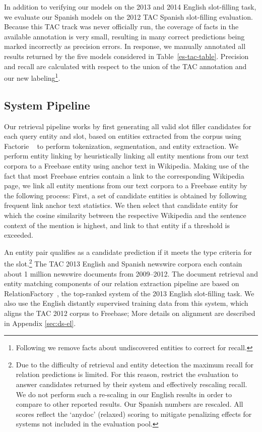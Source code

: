 In addition to verifying our models on the 2013 and 2014 English slot-filling task, we evaluate our Spanish models on the 2012 TAC Spanish slot-filling evaluation. Because this TAC track was never officially run, the coverage of facts in the available annotation is very small, resulting in many correct predictions being marked incorrectly as precision errors. In response, we manually annotated all results returned by the five models considered in Table~\ref{es-tac-table}. Precision and recall are calculated with respect to the union of the TAC annotation and our new labeling\footnote{Following \citet{surdeanu2012multi} we remove facts about undiscovered entities to correct for recall.}.



\subsection { System Pipeline \label{sec:pipeline}}
Our retrieval pipeline works by first generating all valid slot filler candidates for each query entity and slot, based on entities extracted from the corpus using {\sc Factorie} ~\citep{mccallum09:factorie:} to perform tokenization, segmentation, and entity extraction. We perform entity linking by heuristically linking all entity mentions from our text corpora to a Freebase entity using anchor text in Wikipedia. Making use of the fact that most Freebase entries contain a link to the corresponding Wikipedia page, we link all entity mentions from our text corpora to a Freebase entity by the following process:
First, a set of candidate entities is obtained by following frequent link anchor text statistics.
We then select that candidate entity for which the cosine similarity between the respective Wikipedia and the sentence context of the mention is highest, and link to that entity if a threshold is exceeded.

An entity pair qualifies as a candidate prediction if it meets the type criteria for the slot.\footnote{Due to the difficulty of retrieval and entity detection the maximum recall for relation predictions is limited. For this reason, \citet{surdeanu2012multi} restrict the evaluation to answer candidates returned by their system and effectively rescaling recall. We do not perform such a re-scaling in our English results in order to compare to other reported results. Our Spanish numbers are rescaled. All scores reflect the `anydoc' (relaxed) scoring to mitigate penalizing effects for systems not included in the evaluation pool.} The TAC 2013 English and Spanish newswire corpora each contain about 1 million newswire documents from 2009--2012. The document retrieval and entity matching components of our relation extraction pipeline are based on RelationFactory~\citep{roth2014relationfactory}, the top-ranked system of the 2013 English slot-filling task. We also use the English distantly supervised training data from this system, which aligns the TAC 2012 corpus to Freebase; More details on alignment are described in Appendix \ref{sec:ds-el}.

